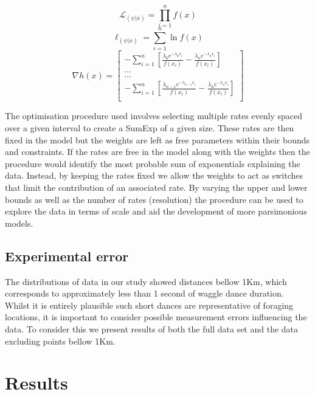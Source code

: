 \documentclass[11pt,usenames,dvipsnames]{article}
\newcommand{\Lagr}{\mathcal{L}}
\begin{document}
\begin{equation}
\Lagr_{(\psi|x)} = \prod_{i=1}^{n} f(x)
\end{equation} 
\begin{equation}
\ell_{(\psi|x)} = \sum_{i=1}^{n} \ln f(x)
\end{equation} 
\begin{equation}
\nabla h(x) = \begin{bmatrix} -\sum_{i=1}^{n} [\frac{\lambda_0 e^{-\lambda_0 x_i}}{f(x_i)} - \frac{\lambda_n e^{-\lambda_n x_i}}{f(x_i)}] \\
... \\
... \\
-\sum_{i=1}^{n} [\frac{\lambda_{n-1} e^{-\lambda_{n-1} x_i}}{f(x_i)} - \frac{\lambda_n e^{-\lambda_n x_i}}{f(x_i)}] \\
\end{bmatrix}
\end{equation}

The optimisation procedure used involves selecting multiple rates evenly spaced over a given interval to create a SumExp of a given size. These rates are then fixed in the model but the weights are left as free parameters within their bounds and constraints. If the rates are free in the model along with the weights then the procedure would identify the most probable sum of exponentials explaining the data. Instead, by keeping the rates fixed we allow the weights to act as switches that limit the contribution of an associated rate. By varying the upper and lower bounds as well as the number of rates (resolution) the procedure can be used to explore the data in terms of scale and aid the development of more parsimonious models. 

\subsection{Experimental error}
The distributions of data in our study showed distances bellow 1Km, which corresponds to approximately less than 1 second of waggle dance duration. Whilst it is entirely plausible such short dances are representative of foraging locations, it is important to consider possible measurement errors influencing the data. To consider this we present results of both the full data set and the data excluding points bellow 1Km. 

\section{Results}
\end{document}
